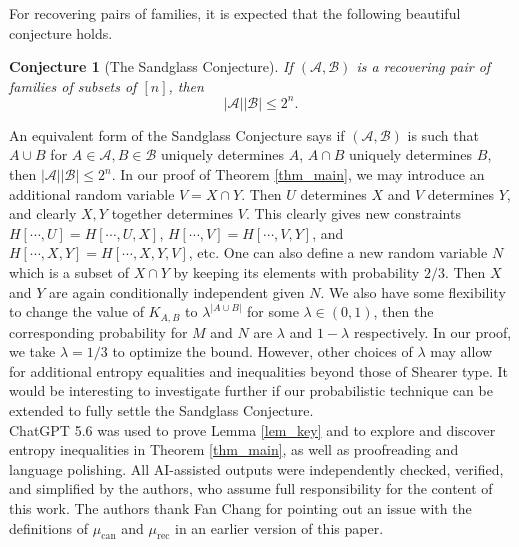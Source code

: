 \documentclass{article}
\newtheorem{conjecture}[theorem]{Conjecture}
\begin{document}
For recovering pairs of families, it is expected that the following beautiful conjecture \cite{AS94} holds.
\begin{conjecture}[The Sandglass Conjecture]
If $(\mathcal{A}, \mathcal{B})$ is a recovering pair of families of subsets of $[n]$, then 
$$|\mathcal{A}||\mathcal{B}| \le 2^n.$$
\end{conjecture}
An equivalent form of the Sandglass Conjecture says if $(\mathcal{A}, \mathcal{B})$ is such that $A \cup B$ for $A \in \mathcal{A}, B \in \mathcal{B}$ uniquely determines $A$, $A \cap B$ uniquely determines $B$, then $|\mathcal{A}||\mathcal{B}| \le 2^n$. In our proof of Theorem \ref{thm_main}, we may introduce an additional random variable $V=X \cap Y$. Then $U$ determines $X$ and $V$ determines $Y$, and clearly $X, Y$ together determines $V$. This clearly gives new constraints $H[\cdots, U]=H[\cdots, U, X]$, $H[\cdots, V]=H[\cdots, V, Y]$, and $H[\cdots, X,Y]=H[\cdots, X, Y, V]$, etc. One can also define a new random variable $N$ which is a subset of $X \cap Y$ by keeping its elements with probability $2/3$. Then $X$ and $Y$ are again conditionally independent given $N$. We also have some flexibility to change the value of $K_{A,B}$ to $\lambda^{|A \cup B|}$ for some $\lambda \in (0,1)$, then the corresponding probability for $M$ and $N$ are $\lambda$ and $1-\lambda$ respectively. In our proof, we take $\lambda=1/3$ to optimize the bound. However, other choices of $\lambda$ may allow for additional entropy equalities and inequalities beyond those of Shearer type. It would be interesting to investigate further if our probabilistic technique can be extended to fully settle the Sandglass Conjecture.\\

 ChatGPT 5.6 was used to prove Lemma \ref{lem_key} and to explore and discover entropy inequalities in Theorem \ref{thm_main}, as well as proofreading and language polishing. All AI-assisted outputs were independently checked, verified, and simplified by the authors, who assume full responsibility for the content of this work. The authors thank Fan Chang for pointing out an issue with the definitions of \(\mu_{\mathrm{can}}\) and \(\mu_{\mathrm{rec}}\) in an earlier version of this paper.
\end{document}

